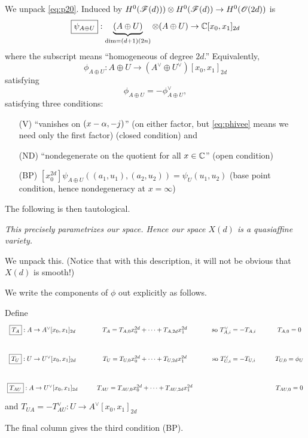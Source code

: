 {

We unpack \eqref{eq:p20}.  Induced by $H^0({\mathscr{F}}(d))) \otimes H^0({\mathscr{F}}(d)) \rightarrow H^0({\mathscr{O}}(2d))$ is
$$
\boxed{\psi_{A \oplus U}} : \underbrace{(A \oplus U)}_{\text{dim}=(d+1)(2n)} \otimes (A \oplus U) \rightarrow \mathbb{C}[x_0, x_1]_{2d}$$
where the subscript means ``homogeneous of degree $2d$.'' Equivalently,
$$
\boxed{\phi_{A \oplus U}} : A \oplus U \rightarrow (A^\vee \oplus U^\vee)[x_0, x_1]_{2d}$$
satisfying \begin{equation}
  \label{eq:phivee}
  \phi_{A \oplus U} = - \phi^\vee_{A \oplus U},
  \end{equation}
satisfying three conditions:
\begin{enumerate}
\item[(V)] ``vanishes on $(x-\alpha, -j)$'' (on either factor, but \eqref{eq:phivee} means we need only the first factor) (closed condition) and
  \item[(ND)]  ``nondegenerate on the quotient for all $x \in \mathbb{C}$''  (open condition)
  \item[(BP)] $[x_0^{2d}] \psi_{A \oplus U} ( (a_1, u_1), (a_2, u_2)) = \psi_U(u_1, u_2)$ (base point condition, hence nondegeneracy at $x =\infty$) 
\end{enumerate}

The following is then tautological.

 {\em This precisely parametrizes our space. Hence our space $X(d)$ is a quasiaffine variety.}

We unpack this.  (Notice that with this description, it will not be obvious that $X(d)$ is smooth!)

We write the components of $\phi$ out explicitly as follows.

Define
$$\xymatrix{\boxed{T_A}: A \rightarrow A^\vee[x_0, x_1]_{2d} &
T_A = T_{A,0}x_0^{2d} + \cdots + T_{A,2d} x_1^{2d} & \text{so } T_{A,i}^\vee = - T_{A,i} & T_{A,0}=0 \\
  \boxed{T_U}: U \rightarrow U^\vee[x_0, x_1]_{2d} & T_U = T_{U,0}x_0^{2d} + \cdots + T_{U,2d} x_1^{2d} & \text{so } T_{U,i}^\vee = - T_{U,i} & T_{U,0}=\phi_U  \\
  \boxed{T_{AU}}: A \rightarrow U^\vee[x_0, x_1]_{2d} & T_{AU} = T_{AU,0}x_0^{2d} + \cdots + T_{AU,2d} x_1^{2d} &  & T_{AU,0}=0
}$$
and $\boxed{T_{UA}} = - T_{AU}^\vee: U \rightarrow A^\vee[x_0, x_1]_{2d}$

The final column gives the third condition (BP).

}
